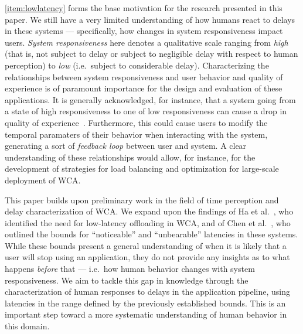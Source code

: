 \cref{item:lowlatency} forms the base motivation for the research presented in this paper.
We still have a very limited understanding of how humans react to delays in these systems --- specifically, how changes in system responsiveness impact users.
\emph{System responsiveness} here denotes a qualitative scale ranging from \emph{high} (that is, not subject to delay or subject to negligible delay with respect to human perception) to \emph{low} (i.e.\ subject to considerable delay).
Characterizing the relationships between system responsiveness and user behavior and quality of experience is of paramount importance for the design and evaluation of these applications.
It is generally acknowledged, for instance, that a system going from a state of high responsiveness to one of low responsiveness can cause a drop in quality of experience~\cite{dabrowsky:2011:40years}. 
Furthermore, this could cause users to modify the temporal paramaters of their behavior when interacting with the system, generating a sort of \emph{feedback loop} between user and system.
A clear understanding of these relationships would allow, for instance, for the development of strategies for load balancing and optimization for large-scale deployment of WCA.\@

This paper builds upon preliminary work in the field of time perception and delay characterization of WCA.\@
We expand upon the findings of Ha et al.~\cite{Ha:TowardsWearableCogAssist}, who identified the need for low-latency offloading in WCA, and of Chen et al.~\cite{Chen:AnEmpiricalStudyOfLatency}, who outlined the bounds for ``noticeable'' and ``unbearable'' latencies in these systems.
While these bounds present a general understanding of when it is likely that a user will stop using an application, they do not provide any insights as to what happens \emph{before} that --- i.e.\ how human behavior changes with system responsiveness.
We aim to tackle this gap in knowledge through the characterization of human responses to delays in the application pipeline, using latencies in the range defined by the previously established bounds.
This is an important step toward a more systematic understanding of human behavior in this domain.

